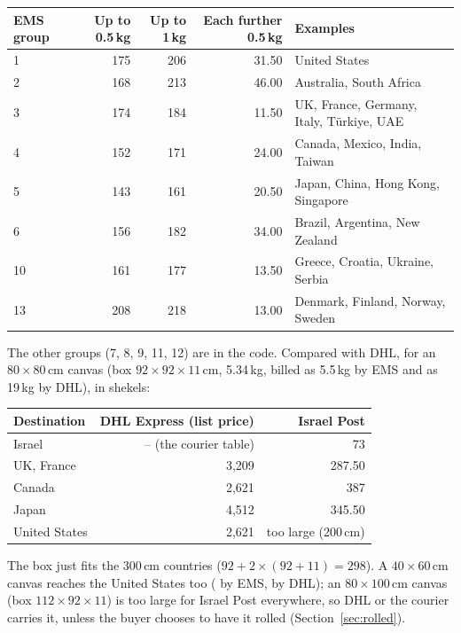 \documentclass[11pt,a4paper]{article}
\newcommand{\nis}[1]{\text{NIS\,#1}}
\begin{document}
\begin{center}
\small
{}
\begin{tabular}{@{}lrrr>{\raggedright\arraybackslash}p{5.6cm}@{}}
  \toprule
  EMS group & Up to 0.5\,kg & Up to 1\,kg & Each further 0.5\,kg & Examples \\
  \midrule
  1 & 175 & 206 & 31.50 & United States \\
  2 & 168 & 213 & 46.00 & Australia, South Africa \\
  3 & 174 & 184 & 11.50 & UK, France, Germany, Italy, Türkiye, UAE \\
  4 & 152 & 171 & 24.00 & Canada, Mexico, India, Taiwan \\
  5 & 143 & 161 & 20.50 & Japan, China, Hong Kong, Singapore \\
  6 & 156 & 182 & 34.00 & Brazil, Argentina, New Zealand \\
  10 & 161 & 177 & 13.50 & Greece, Croatia, Ukraine, Serbia \\
  13 & 208 & 218 & 13.00 & Denmark, Finland, Norway, Sweden \\
  \bottomrule
\end{tabular}
\end{center}
The other groups (7, 8, 9, 11, 12) are in the code. Compared with DHL, for an $80\times80$\,cm
canvas (box $92\times92\times11$\,cm, 5.34\,kg, billed as 5.5\,kg by EMS and as 19\,kg by DHL),
in shekels:
\begin{center}
\small
{}
\begin{tabular}{@{}lrr@{}}
  \toprule
  Destination & DHL Express (list price) & Israel Post \\
  \midrule
  Israel & -- (the courier table) & 73 \\
  UK, France & 3{,}209 & 287.50 \\
  Canada & 2{,}621 & 387 \\
  Japan & 4{,}512 & 345.50 \\
  United States & 2{,}621 & too large (200\,cm) \\
  \bottomrule
\end{tabular}
\end{center}
The box just fits the 300\,cm countries ($92 + 2\times(92+11) = 298$). A $40\times60$\,cm canvas
reaches the United States too (\nis{332} by EMS, \nis{1{,}637} by DHL); an $80\times100$\,cm
canvas (box $112\times92\times11$) is too large for Israel Post everywhere, so DHL or the courier
carries it, unless the buyer chooses to have it rolled (Section~\ref{sec:rolled}).
\end{document}
